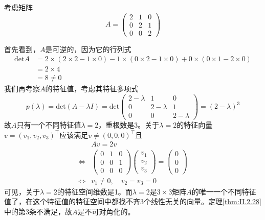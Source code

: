 \documentclass[../main.tex]{subfiles}
\begin{document}
\begin{example}
    考虑矩阵
    \[A=\left(\begin{array}{ccc}2&1&0\\0&2&1\\0&0&2\end{array}\right)\]

    首先看到，$A$是可逆的，因为它的行列式
    \[
        \begin{aligned}\mathrm{det}A & =2\times\left(2\times 2-1\times 0\right)-1\times\left(0\times 2-1\times 0\right)+0\times\left(0\times 1-2\times 0\right) \\
                             & =2\times 4                                                                                                               \\
                             & =8\neq 0\end{aligned}
    \]
    我们再考察$A$的特征值，考虑其特征多项式
    \[p\left(\lambda\right)=\mathrm{det}\left(A-\lambda I\right)=\mathrm{det}\left(\begin{array}{ccc}2-\lambda &1&0\\0&2-\lambda&1\\0&0&2-\lambda\end{array}\right)=\left(2-\lambda\right)^3\]
    故$A$只有一个不同特征值$\lambda=2$，重根数是$3$。关于$\lambda=2$的特征向量$v=\left(v_1,v_2,v_3\right)^\intercal$应该满足$v\neq\left(0,0,0\right)^\intercal$且
    \[\begin{aligned}                                                                                                                & Av=2v                                                                                                                                                              \\
                                                                                                               \Leftrightarrow & \left(\begin{array}{ccc}0&1&0\\0&0&1\\0&0&0\end{array}\right)\left(\begin{array}{c}v_1\\v_2\\v_3\end{array}\right)=\left(\begin{array}{c}0\\0\\0\end{array}\right) \\
                                                                                                               \Leftrightarrow & v_1\neq 0,\quad v_2=v_3=0\end{aligned}
    \]
    可见，关于$\lambda=2$的特征空间维数是1。而$\lambda=2$是$3\times 3$矩阵$A$的唯一一个不同特征值了，在这个特征值的特征空间中都找不齐3个线性无关的向量。定理\ref{thm:II.2.28}中的第3条不满足，故$A$是不可对角化的。
\end{example}
\end{document}
